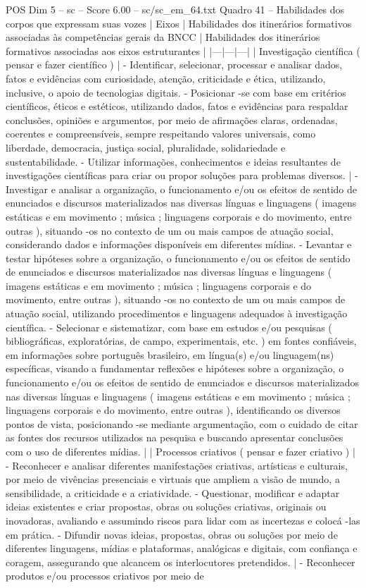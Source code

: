 \begin{textsample}{POS Dim 5 – sc – Score 6.00 – sc/sc\_em\_64.txt}
Quadro 41 – Habilidades dos corpos que expressam suas vozes | Eixos | Habilidades dos itinerários formativos associadas às competências gerais da BNCC | Habilidades dos itinerários formativos associadas aos eixos estruturantes | |---|---|---| | Investigação científica ( pensar e fazer científico ) | - Identificar, selecionar, processar e analisar dados, fatos e evidências com curiosidade, atenção, criticidade e ética, utilizando, inclusive, o apoio de tecnologias digitais. - Posicionar -se com base em critérios científicos, éticos e estéticos, utilizando dados, fatos e evidências para respaldar conclusões, opiniões e argumentos, por meio de afirmações claras, ordenadas, coerentes e compreensíveis, sempre respeitando valores universais, como liberdade, democracia, justiça social, pluralidade, solidariedade e sustentabilidade. - Utilizar informações, conhecimentos e ideias resultantes de investigações científicas para criar ou propor soluções para problemas diversos. | - Investigar e analisar a organização, o funcionamento e/ou os efeitos de sentido de enunciados e discursos materializados nas diversas línguas e linguagens ( imagens estáticas e em movimento ; música ; linguagens corporais e do movimento, entre outras ), situando -os no contexto de um ou mais campos de atuação social, considerando dados e informações disponíveis em diferentes mídias. - Levantar e testar hipóteses sobre a organização, o funcionamento e/ou os efeitos de sentido de enunciados e discursos materializados nas diversas línguas e linguagens ( imagens estáticas e em movimento ; música ; linguagens corporais e do movimento, entre outras ), situando -os no contexto de um ou mais campos de atuação social, utilizando procedimentos e linguagens adequados à investigação científica. - Selecionar e sistematizar, com base em estudos e/ou pesquisas ( bibliográficas, exploratórias, de campo, experimentais, etc. ) em fontes confiáveis, em informações sobre português brasileiro, em língua(s) e/ou linguagem(ns) específicas, visando a fundamentar reflexões e hipóteses sobre a organização, o funcionamento e/ou os efeitos de sentido de enunciados e discursos materializados nas diversas línguas e linguagens ( imagens estáticas e em movimento ; música ; linguagens corporais e do movimento, entre outras ), identificando os diversos pontos de vista, posicionando -se mediante argumentação, com o cuidado de citar as fontes dos recursos utilizados na pesquisa e buscando apresentar conclusões com o uso de diferentes mídias. | | Processos criativos ( pensar e fazer criativo ) | - Reconhecer e analisar diferentes manifestações criativas, artísticas e culturais, por meio de vivências presenciais e virtuais que ampliem a visão de mundo, a sensibilidade, a criticidade e a criatividade. - Questionar, modificar e adaptar ideias existentes e criar propostas, obras ou soluções criativas, originais ou inovadoras, avaliando e assumindo riscos para lidar com as incertezas e colocá -las em prática. - Difundir novas ideias, propostas, obras ou soluções por meio de diferentes linguagens, mídias e plataformas, analógicas e digitais, com confiança e coragem, assegurando que alcancem os interlocutores pretendidos. | - Reconhecer produtos e/ou processos criativos por meio de 
\end{textsample}
